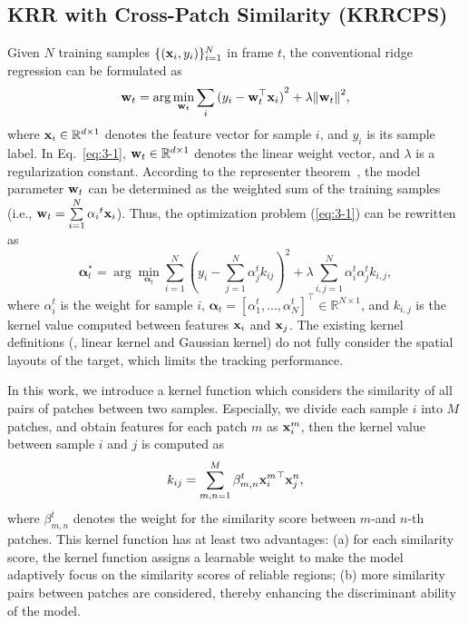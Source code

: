 \documentclass[10pt,twocolumn,letterpaper]{article}
\begin{document}
\subsection{KRR with Cross-Patch Similarity (KRRCPS)}
Given $N$ training samples $\{ ({{\bf x}_i},{y_i})\} _{i = 1}^N$ in frame $t$,
the conventional ridge regression can be formulated as
\begin{equation}
{\bf w}_t=\arg\min_{{\bf w}_t} \sum\limits_i {{{({y_i} - {{\bf{w}}_t^\top}
{{\bf{x}}_i})}^2} + \lambda {{\left\| {\bf{w}}_t \right\|}^2}},
\label{eq:3-1}
\end{equation}
where ${{\bf x}_i}\in \mathbb{R}^{d\times 1}$ denotes the feature vector for sample $i$,
and $y_i$ is its sample label.
In Eq.~\ref{eq:3-1}, ${\bf w}_t\in \mathbb{R}^{d\times 1}$ denotes the
linear weight vector, and $\lambda$ is a regularization constant.
According to the representer theorem~\cite{representertheorem}, the model parameter
${\bf w}_t$ can be determined as the weighted sum of the training samples (i.e.,
${\bf{w}}_t = \sum\limits_{i = 1}^N {{\alpha _i}^t{{\bf{x}}_i}} $).
Thus, the optimization problem (\ref{eq:3-1}) can be rewritten as
\begin{equation}
{\bm \alpha}_t^{*}=\arg\min_{ {\bm \alpha}_t} \sum\limits_{i=1}^N {{{({y_i}
- \sum\limits_{j = 1}^N {{\alpha _j^t}{k_{ij}}} )^2}} +
\lambda } \sum\limits_{i, j=1}^N {\alpha _i^t\alpha_j^t{k_{i,j}}},
\label{eq:3-2}
\end{equation}
where $\alpha_i^t$ is the weight for sample $i$, ${\bm \alpha}_t=\left[\alpha_1^t,...,\alpha_N^t\right]^\top \in \mathbb{R}^{N\times 1}$,
and $k_{i,j}$ is the kernel value computed between features ${\bf x}_i$ and ${\bf x}_j$.
The existing kernel definitions (\eg, linear kernel and Gaussian kernel) do not fully
consider the spatial layouts of the target, which limits the tracking performance.

In this work, we introduce a kernel function which considers the similarity of all pairs of patches between two samples.
Especially, we divide each sample $i$ into $M$ patches, and obtain features for each patch $m$ as ${\bf x}_i^m$,
then the kernel value between sample $i$ and $j$ is computed as
\begin{equation}
{k_{ij}} = \sum\limits_{m, n = 1}^M {{\beta _{m,n}^t}{{{\bf{x}}_{i}^m}^\top}} {\bf{x}}_{j}^{n},
\label{eq:3-3}
\end{equation}
where $\beta_{m,n}^t$ denotes the weight for the similarity score between $m$-and $n$-th patches.
This kernel function has at least two advantages: (a) for each similarity score, the kernel function assigns a learnable
weight to make the model adaptively focus on the similarity scores of reliable regions; (b) more similarity pairs
between patches are considered, thereby enhancing the discriminant ability of the model.
\end{document}
